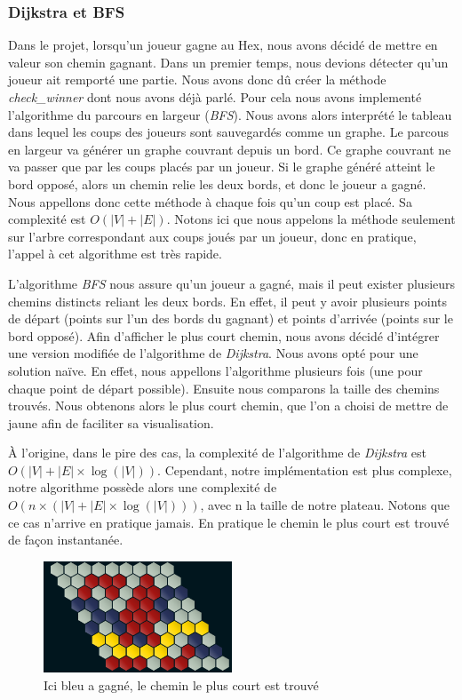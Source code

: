 \subsubsection{Dijkstra et BFS}
Dans le projet, lorsqu'un joueur gagne au Hex, nous avons décidé de mettre en valeur son chemin gagnant.
Dans un premier temps, nous devions détecter qu'un joueur ait remporté une partie. Nous avons donc dû créer la méthode \textit{check\_winner} dont nous avons déjà parlé. Pour cela nous avons implementé l'algorithme du parcours
en largeur (\emph{BFS}). Nous avons alors interprété le tableau dans lequel les coups des joueurs sont sauvegardés comme un graphe. Le parcous en largeur
va générer un graphe couvrant depuis un bord. Ce graphe couvrant ne va passer que par les coups placés par un joueur. Si le graphe généré atteint le bord opposé,
alors un chemin relie les deux bords, et donc le joueur a gagné. Nous appellons donc cette méthode à chaque fois qu'un coup est placé. Sa complexité est $O(\lvert V \rvert + \lvert E \rvert)$.
Notons ici que nous appelons la méthode seulement sur l'arbre correspondant aux coups joués par un joueur, donc en pratique, l'appel à cet algorithme
est très rapide.

L'algorithme \emph{BFS} nous assure qu'un joueur a gagné, mais il peut exister plusieurs chemins distincts reliant les deux bords. En effet,
il peut y avoir plusieurs points de départ (points sur l'un des bords du gagnant) et points d'arrivée (points sur le bord opposé).
Afin d'afficher le plus court chemin, nous avons décidé d'intégrer une version modifiée de l'algorithme de \emph{Dijkstra}.
Nous avons opté pour une solution naïve. En effet, nous appellons l'algorithme plusieurs fois (une pour chaque point de départ possible).
Ensuite nous comparons la taille des chemins trouvés. Nous obtenons alors le plus court chemin, que l'on a choisi de mettre de jaune 
afin de faciliter sa visualisation.

À l'origine, dans le pire des cas, la complexité de l'algorithme de \emph{Dijkstra} est $O(\lvert V \rvert + \lvert E \rvert \times \log(\lvert V \rvert))$.
Cependant, notre implémentation est plus complexe, notre algorithme possède alors une complexité de $O(n \times (\lvert V \rvert+ \lvert E \rvert\times \log(\lvert V \rvert)))$, avec n la taille de notre plateau.
Notons que ce cas n'arrive en pratique jamais. En pratique le chemin le plus court est trouvé de façon instantanée.

\begin{figure}[h]
    \begin{center}
        \includegraphics[width=0.5\textwidth]{root/chemin_gagnant.png}
    \end{center}
    \caption{Ici bleu a gagné, le chemin le plus court est trouvé}\label{fig:chemin_gagnant}
\end{figure}